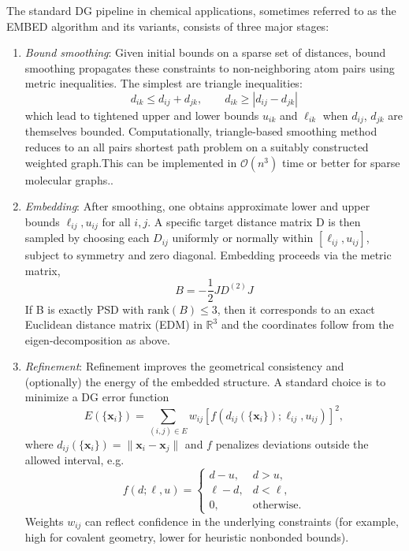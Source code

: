 \documentclass[12pt]{article}
\begin{document}
The standard DG pipeline in chemical applications, sometimes referred to as the EMBED algorithm and its variants, consists of three major stages:\cite{CH2_havel_kuntz_crippen_1983,CH2_havel_dg_review_1998,CH2_spellmeyer_dg_conf_1997}
\begin{enumerate}
  \item \textit{Bound smoothing}: Given initial bounds on a sparse set of distances, bound smoothing propagates these constraints to non-neighboring atom pairs using metric inequalities. 
  The simplest are triangle inequalities: 
  \begin{equation}
  d_{ik} \le d_{ij} + d_{jk}, \qquad 
  d_{ik} \ge |d_{ij} - d_{jk}|
  \label{eq-Bound_smoothing}
  \end{equation}
  which lead to tightened upper and lower bounds $u_{ik}$ and $\ell_{ik}$ when $d_{ij}$, $d_{jk}$ are themselves bounded. Computationally, triangle-based smoothing method reduces to an all pairs shortest path problem on a suitably constructed weighted graph.This can be implemented in $\mathcal{O}(n^3)$ time or better for sparse molecular graphs.\cite{CH2_havel_kuntz_crippen_1983,CH2_havel_dg_review_1998}.
  

  \item \textit{Embedding}: After smoothing, one obtains approximate lower and upper bounds $\ell_{ij},u_{ij}$ for all $i,j$. A specific target distance matrix D is then sampled by choosing each $D_{ij}$ uniformly or normally within $[\ell_{ij},u_{ij}]$, subject to symmetry and zero diagonal. Embedding proceeds via the metric matrix, 
  \begin{equation}
  B = -\frac{1}{2} J D^{(2)} J
  \end{equation} 
  If B is exactly PSD with $\mathrm{rank}(B) \le 3$, then it corresponds to an exact Euclidean distance matrix (EDM) in $\mathbb{R}^3$ and the coordinates follow from the eigen-decomposition as above.
  
  \item \textit{Refinement}: Refinement improves the geometrical consistency and (optionally) the energy of the embedded structure. 
  A standard choice is to minimize a DG error function
\begin{equation}
 E(\{\bm{x}_i\}) =
 \sum_{(i,j)\in E} w_{ij}
 \left[
  f(d_{ij}(\{\bm{x}_i\}); \ell_{ij}, u_{ij})
 \right]^2,
\end{equation}
where $d_{ij}(\{\bm{x}_i\}) = \|\bm{x}_i - \bm{x}_j\|$ and $f$ penalizes deviations outside the allowed interval, e.g.
\begin{equation}
 f(d;\ell,u) =
 \begin{cases}
  d - u, & d > u,\\
  \ell - d, & d < \ell,\\
  0, & \text{otherwise}.
 \end{cases}
\end{equation}
Weights $w_{ij}$ can reflect confidence in the underlying constraints (for example, high for covalent geometry, lower for heuristic nonbonded bounds).\cite{CH2_crippen_chem_dg_1991,CH2_havel_dg_review_1998}


\end{enumerate}
\end{document}
